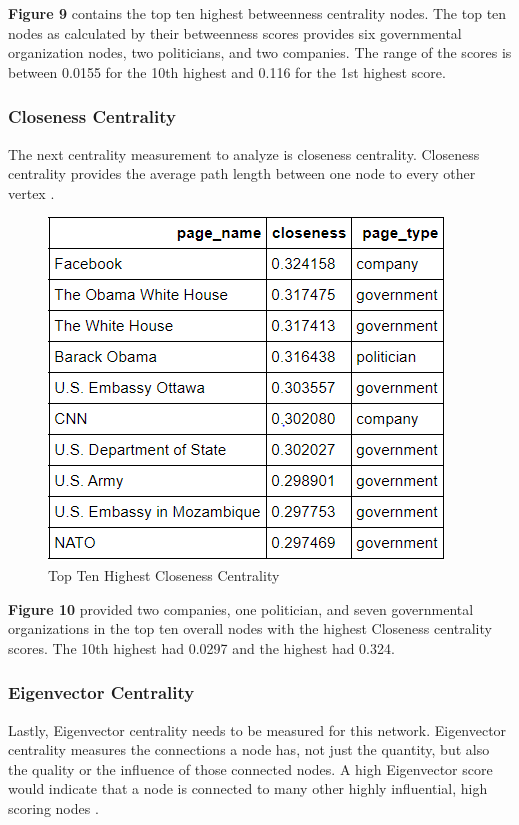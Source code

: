 \documentclass[11pt,twocolumn]{article}
\begin{document}
\textbf{Figure 9} contains the top ten highest betweenness centrality nodes. The top ten nodes as calculated by their betweenness scores provides six governmental organization nodes, two politicians, and two companies. The range of the scores is between 0.0155 for the 10th highest and 0.116 for the 1st highest score.


\subsubsection{Closeness Centrality}
The next centrality measurement to analyze is closeness centrality. Closeness centrality provides the average path length between one node to every other vertex \cite{newman2008mathematics}.

\begin{figure}[hbt!]
\includegraphics[scale=0.5]{top_ten_closeness.png} 
\caption{Top Ten Highest Closeness Centrality}
\end{figure}

\textbf{Figure 10} provided two companies, one politician, and seven governmental organizations in the top ten overall nodes with the highest Closeness centrality scores. The 10th highest had 0.0297 and the highest had 0.324.


\subsubsection{Eigenvector Centrality} 

Lastly, Eigenvector centrality needs to be measured for this network. Eigenvector centrality measures the connections a node has, not just the quantity, but also the quality or the influence of those connected nodes. A high Eigenvector score would indicate that a node is connected to many other highly influential, high scoring nodes \cite{newman2008mathematics}. 
 
\end{document}
